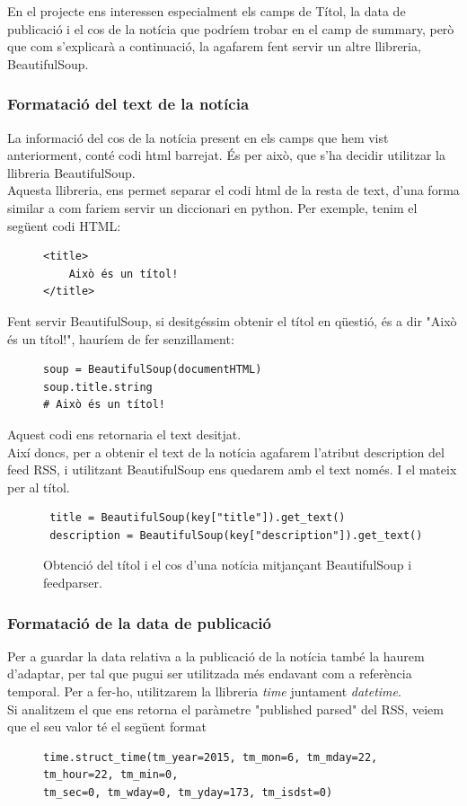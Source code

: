 \documentclass[12pt,a4paper,openright,oneside]{article}
\numberwithin{equation}{section}
\theoremstyle{definition}
\begin{document}
En el projecte ens interessen especialment els camps de Títol, la data de publicació i el cos de la notícia que podríem trobar en el camp de summary, però que com s'explicarà a continuació, la agafarem fent servir un altre llibreria, BeautifulSoup.
\subsubsection*{Formatació del text de la notícia}
La informació del cos de la notícia present en els camps que hem vist anteriorment, conté codi html barrejat. És per això, que s'ha decidir utilitzar la llibreria BeautifulSoup.\\
Aquesta llibreria, ens permet separar el codi html de la resta de text, d'una forma similar a com fariem servir un diccionari en python. Per exemple, tenim el següent codi HTML:

\begin{figure}[!htbp]
\begin{verbatim}
<title>
	Això és un títol!
</title>
\end{verbatim}
\end{figure}
Fent servir BeautifulSoup, si desitgéssim obtenir el títol en qüestió, és a dir "Això és un títol!", hauríem de fer senzillament:

\begin{figure}[!htbp]
\begin{verbatim}
soup = BeautifulSoup(documentHTML)
soup.title.string
# Això és un títol!
\end{verbatim}
\end{figure}
Aquest codi ens retornaria el text desitjat.\\
Així doncs, per a obtenir el text de la notícia agafarem l'atribut description del feed RSS, i utilitzant BeautifulSoup\cite{beautifulsoup} ens quedarem amb el text només. I el mateix per al títol.	
\begin{figure}[!htbp]
\begin{verbatim}
 title = BeautifulSoup(key["title"]).get_text()
 description = BeautifulSoup(key["description"]).get_text()
\end{verbatim}
\caption{Obtenció del títol i el cos d'una notícia mitjançant BeautifulSoup i feedparser.}
\end{figure}
\subsubsection*{Formatació de la data de publicació}
Per a guardar la data relativa a la publicació de la notícia també la haurem d'adaptar, per tal que pugui ser utilitzada més endavant com a referència temporal. Per a fer-ho, utilitzarem la llibreria \emph{time} juntament \emph{datetime}.\\
Si analitzem el que ens retorna el paràmetre "published parsed" del RSS, veiem que el seu valor té el següent format\cite{rss}
\begin{figure}[!htbp]
\begin{verbatim}
time.struct_time(tm_year=2015, tm_mon=6, tm_mday=22, tm_hour=22, tm_min=0, 
tm_sec=0, tm_wday=0, tm_yday=173, tm_isdst=0)
\end{verbatim}
\end{figure}
\end{document}
